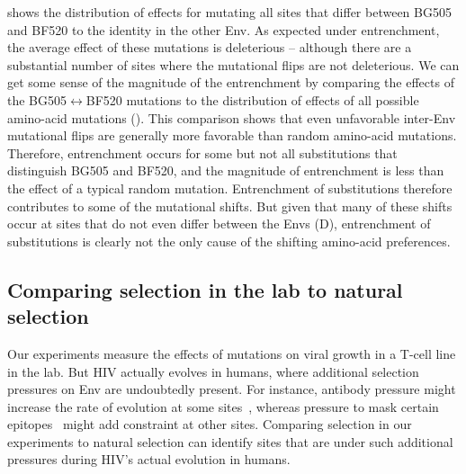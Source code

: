 \documentclass[9pt]{elife}
\begin{document}
 shows the distribution of effects for mutating all sites that differ between BG505 and BF520 to the identity in the other Env.
As expected under entrenchment, the average effect of these mutations is deleterious -- although there are a substantial number of sites where the mutational flips are not deleterious. 
We can get some sense of the magnitude of the entrenchment by comparing the effects of the BG505$\leftrightarrow$BF520 mutations to the distribution of effects of all possible amino-acid mutations ().
This comparison shows that even unfavorable inter-Env mutational flips are generally more favorable than random amino-acid mutations.
Therefore, entrenchment occurs for some but not all substitutions that distinguish BG505 and BF520, and the magnitude of entrenchment is less than the effect of a typical random mutation.
Entrenchment of substitutions therefore contributes to some of the mutational shifts.
But given that many of these shifts occur at sites that do not even differ between the Envs (D), entrenchment of substitutions is clearly not the only cause of the shifting amino-acid preferences.


\subsection{Comparing selection in the lab to natural selection}
Our experiments measure the effects of mutations on viral growth in a T-cell line in the lab.
But HIV actually evolves in humans, where additional selection pressures on Env are undoubtedly present.
For instance, antibody pressure might increase the rate of evolution at some sites~\citep{albert1990rapid,wei2003antibody,richman2003rapid}, whereas pressure to mask certain epitopes~\citep{kwong2002hiv} might add constraint at other sites. 
Comparing selection in our experiments to natural selection can identify sites that are under such additional pressures during HIV's actual evolution in humans.
\end{document}
